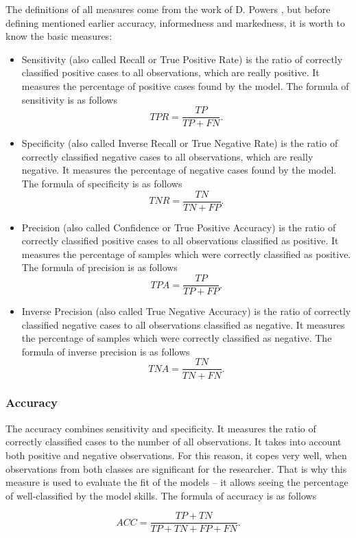 \documentclass[english]{pwr_wmat_praca_dyplomowa}
\theoremstyle{plain}
\theoremstyle{definition}
\numberwithin{theorem}{chapter}
\begin{document}
The definitions of all measures come from the work of D. Powers \cite{powers2011evaluation}, but before defining mentioned earlier accuracy, informedness and markedness, it is worth to know the basic measures:

\begin{itemize}
	\item Sensitivity (also called Recall or True Positive Rate) is the ratio of correctly classified positive cases to all observations, which are really positive. It measures the percentage of positive cases found by the model. The formula of sensitivity is as follows
	$$ TPR = \frac{TP}{TP + FN}. $$
	\item Specificity (also called Inverse Recall or True Negative Rate) is the ratio of correctly classified negative cases to all observations, which are really negative. It measures the percentage of negative cases found by the model. The formula of specificity is as follows
	$$ TNR = \frac{TN}{TN + FP}. $$
	\item Precision (also called Confidence or True Positive Accuracy) is the ratio of correctly classified positive cases to all observations classified as positive. It measures the percentage of samples which were correctly classified as positive. The formula of precision is as follows
	$$ TPA = \frac{TP}{TP + FP}. $$
	\item Inverse Precision (also called True Negative Accuracy) is the ratio of correctly classified negative cases to all observations classified as negative. It measures the percentage of samples which were correctly classified as negative. The formula of inverse precision is as follows
	$$ TNA = \frac{TN}{TN + FN}. $$
\end{itemize}

\subsubsection{Accuracy}

The accuracy combines sensitivity and specificity. It measures the ratio of correctly classified cases to the number of all observations. It takes into account both positive and negative observations. For this reason, it copes very well, when observations from both classes are significant for the researcher. That is why this measure is used to evaluate the fit of the models -- it allows seeing the percentage of well-classified by the model skills. The formula of accuracy is as follows

$$ ACC = \frac{TP + TN}{TP + TN + FP + FN}. $$
\end{document}
